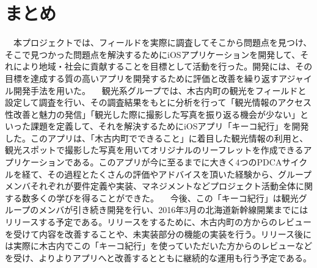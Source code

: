 \section{まとめ}
\quad　本プロジェクトでは、フィールドを実際に調査してそこから問題点を見つけ、そこで見つかった問題点を解決するためにiOSアプリケーションを開発して、それにより地域・社会に貢献することを目標として活動を行った。開発には、その目標を達成する質の高いアプリを開発するために評価と改善を繰り返すアジャイル開発手法を用いた。
\quad　観光系グループでは、木古内町の観光をフィールドと設定して調査を行い、その調査結果をもとに分析を行って「観光情報のアクセス性改善と魅力の発信」「観光した際に撮影した写真を振り返る機会が少ない」といった課題を定義して、それを解決するためにiOSアプリ「キーコ紀行」を開発した。このアプリは、「木古内町でできること」に着目した観光情報の利用と、観光スポットで撮影した写真を用いてオリジナルのリーフレットを作成できるアプリケーションである。このアプリが今に至るまでに大きく4つのPDCAサイクルを経て、その過程とたくさんの評価やアドバイスを頂いた経験から、グループメンバそれぞれが要件定義や実装、マネジメントなどプロジェクト活動全体に関する数多くの学びを得ることができた。
\quad　今後、この「キーコ紀行」は観光グループのメンバが引き続き開発を行い、2016年3月の北海道新幹線開業までにはリリースする予定である。リリースをするために、木古内町の方からのレビューを受けて内容を改善することや、未実装部分の機能の実装を行う。リリース後には実際に木古内でこの「キーコ紀行」を使っていただいた方からのレビューなどを受け、よりよりアプリへと改善するとともに継続的な運用も行う予定である。

